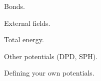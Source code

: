 Bonds.

External fields.

Total energy.

Other potentials (DPD, SPH).

Defining your own potentials.

